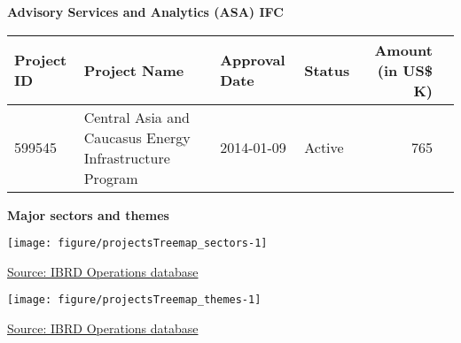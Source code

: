 \documentclass{article}\usepackage[]{graphicx}\usepackage[]{color}
\makeatletter
\def\maxwidth{ %
  \ifdim\Gin@nat@width>\linewidth
    \linewidth
  \else
    \Gin@nat@width
  \fi
}
\makeatother
\begin{document}
\begin{minipage}[b]{0.99\textwidth}
\begin{minipage}[b]{0.99\textwidth}
\begin{minipage}[c]{0.99\textwidth}
     \vspace*{0.5cm}
     \end{minipage}
     
     \begin{minipage}[c]{0.99\textwidth} %
     \raggedright{\color{white!30!blue} \textbf{\large Advisory Services and Analytics (ASA) IFC}}
     \vspace*{0.5cm}
     
{\small
\begin{tabular}{l>{\raggedright}p{2.5in}llrl}
 Project ID & Project Name & Approval Date & Status & Amount (in US\$ K) &  \\ 
  \hline
599545 & Central Asia and Caucasus Energy Infrastructure Program & 2014-01-09 & Active & 765 &  \\ 
  \end{tabular}
}

     \vspace*{0.5cm}
     \end{minipage}
     
    \end{minipage}
\end{minipage}
 
 \newpage
\begin{minipage}[t]{0.99\textwidth}
\raggedright{\color{white!30!blue} \textbf{\large Major sectors and themes}}
     \vspace*{0.5cm}
     
  \begin{minipage}[c]{0.49\textwidth} %
    \vspace*{0.4cm}


{\centering \texttt{[image: figure/projectsTreemap\_sectors-1]} 

}



    \hspace*{0.3cm} \raggedright\footnotesize{\href{http://www.weforum.org/reports/global-competitiveness-report-2015-2016}{Source: IBRD Operations database}}
  \end{minipage}
  \begin{minipage}[c]{0.49\textwidth} %
    \vspace*{0.4cm}


{\centering \texttt{[image: figure/projectsTreemap\_themes-1]} 

}



  \raggedright{\footnotesize{\href{http://lpi.worldbank.org}{Source: IBRD Operations database}}}
  \end{minipage}
\end{minipage}  
 
\end{document}
